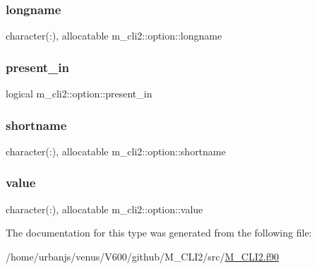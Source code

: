 \subsubsection{\texorpdfstring{longname}{longname}}
{\footnotesize\ttfamily character(\+:), allocatable m\+\_\+cli2\+::option\+::longname\hspace{0.3cm}{\ttfamily [private]}}

\mbox{\label{structm__cli2_1_1option_a89ee89aa168edd8c3e2064b0825e79f8}} 
\subsubsection{\texorpdfstring{present\+\_\+in}{present\_in}}
{\footnotesize\ttfamily logical m\+\_\+cli2\+::option\+::present\+\_\+in\hspace{0.3cm}{\ttfamily [private]}}

\mbox{\label{structm__cli2_1_1option_aebe0555d86a8533193827e348ba65e11}} 
\subsubsection{\texorpdfstring{shortname}{shortname}}
{\footnotesize\ttfamily character(\+:), allocatable m\+\_\+cli2\+::option\+::shortname\hspace{0.3cm}{\ttfamily [private]}}

\mbox{\label{structm__cli2_1_1option_a5fbaefeb93cda8c948cdc7e6de156cd6}} 
\subsubsection{\texorpdfstring{value}{value}}
{\footnotesize\ttfamily character(\+:), allocatable m\+\_\+cli2\+::option\+::value\hspace{0.3cm}{\ttfamily [private]}}



The documentation for this type was generated from the following file\+:\begin{DoxyCompactItemize}
\item 
/home/urbanjs/venus/\+V600/github/\+M\+\_\+\+C\+L\+I2/src/\mbox{\hyperlink{M__CLI2_8f90}{M\+\_\+\+C\+L\+I2.\+f90}}\end{DoxyCompactItemize}
